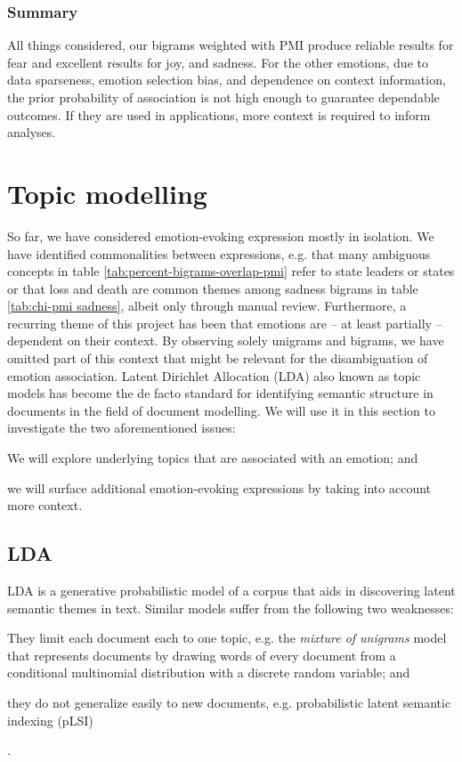 \subsubsection{Summary}

All things considered, our bigrams weighted with PMI produce reliable results for fear and excellent results for joy, and sadness. For the other emotions, due to data sparseness, emotion selection bias, and dependence on context information, the prior probability of association is not high enough to guarantee dependable outcomes. If they are used in applications, more context is required to inform analyses.

\section{Topic modelling}

So far, we have considered emotion-evoking expression mostly in isolation. We have identified commonalities between expressions, e.g. that many ambiguous concepts in table \ref{tab:percent-bigrams-overlap-pmi} refer to state leaders or states or that loss and death are common themes among sadness bigrams in table \ref{tab:chi-pmi sadness}, albeit only through manual review.
Furthermore, a recurring theme of this project has been that emotions are -- at least partially -- dependent on their context. By observing solely unigrams and bigrams, we have omitted part of this context that might be relevant for the disambiguation of emotion association.
Latent Dirichlet Allocation (LDA) also known as topic models has become the de facto standard for identifying semantic structure in documents in the field of document modelling. We will use it in this section to investigate the two aforementioned issues: \begin{inparaenum} \item We will explore underlying topics that are associated with an emotion; and \item we will surface additional emotion-evoking expressions by taking into account more context. \end{inparaenum}

\subsection{LDA}

LDA is a generative probabilistic model of a corpus that aids in discovering latent semantic themes in text. Similar models suffer from the following two weaknesses: \begin{inparaenum} \item They limit each document each to one topic, e.g. the \textit{mixture of unigrams} model \cite{mixture_of_unigrams} that represents documents by drawing words of every document from a conditional multinomial distribution with a discrete random variable; and \item they do not generalize easily to new documents, e.g. probabilistic latent semantic indexing (pLSI) \cite{plsi} \end{inparaenum}.

